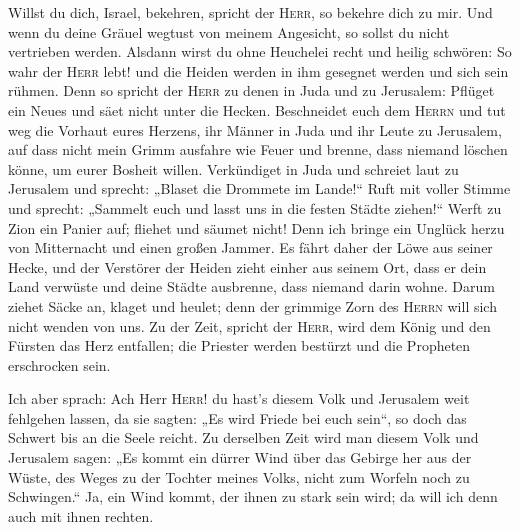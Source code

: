  Willst du dich, Israel, bekehren, spricht der
\textsc{Herr}, so bekehre dich zu mir. Und wenn du deine Gräuel wegtust
von meinem Angesicht, so sollst du nicht vertrieben werden.
 Alsdann wirst du ohne Heuchelei recht und heilig
schwören: So wahr der \textsc{Herr} lebt! und die Heiden werden in ihm
gesegnet werden und sich sein rühmen.  Denn so spricht der
\textsc{Herr} zu denen in Juda und zu Jerusalem: Pflüget ein Neues und
säet nicht unter die Hecken.  Beschneidet euch dem
\textsc{Herrn} und tut weg die Vorhaut eures Herzens, ihr Männer in Juda
und ihr Leute zu Jerusalem, auf dass nicht mein Grimm ausfahre wie Feuer
und brenne, dass niemand löschen könne, um eurer Bosheit willen.
 Verkündiget in Juda und schreiet laut zu Jerusalem und
sprecht: „Blaset die Drommete im Lande!{}`` Ruft mit voller Stimme und
sprecht: „Sammelt euch und lasst uns in die festen Städte ziehen!{}``
 Werft zu Zion ein Panier auf; fliehet und säumet nicht!
Denn ich bringe ein Unglück herzu von Mitternacht und einen großen
Jammer.  Es fährt daher der Löwe aus seiner Hecke, und der
Verstörer der Heiden zieht einher aus seinem Ort, dass er dein Land
verwüste und deine Städte ausbrenne, dass niemand darin wohne.
 Darum ziehet Säcke an, klaget und heulet; denn der
grimmige Zorn des \textsc{Herrn} will sich nicht wenden von uns.
 Zu der Zeit, spricht der \textsc{Herr}, wird dem König
und den Fürsten das Herz entfallen; die Priester werden bestürzt und die
Propheten erschrocken sein.

 Ich aber sprach: Ach Herr \textsc{Herr}! du hast's
diesem Volk und Jerusalem weit fehlgehen lassen, da sie sagten: „Es wird
Friede bei euch sein``, so doch das Schwert bis an die Seele reicht.
 Zu derselben Zeit wird man diesem Volk und Jerusalem
sagen: „Es kommt ein dürrer Wind über das Gebirge her aus der Wüste, des
Weges zu der Tochter meines Volks, nicht zum Worfeln noch zu
Schwingen.``  Ja, ein Wind kommt, der ihnen zu stark sein
wird; da will ich denn auch mit ihnen rechten.

